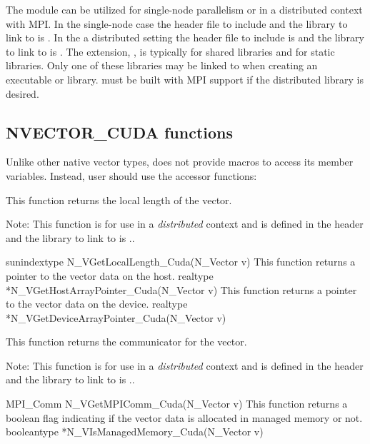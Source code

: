 The {\nveccuda} module can be utilized for single-node parallelism or in a
distributed context with MPI. In the single-node case the header file to
include  and the library to link to is
. In the a distributed setting the header
file to include is  and the library to link to is
. The extension, , is
typically  for shared libraries and  for static libraries.
Only one of these libraries may be linked to when creating an executable
or library. {\sundials} must be built with MPI support if the distributed
library is desired.


\subsection{NVECTOR\_CUDA functions}
\label{ss:nvec_cuda_functions}

Unlike other native {\sundials} vector types, {\nveccuda} does not provide macros
to access its member variables. Instead, user should use the accessor functions:
{
  This function returns the local length of the vector.

  Note: This function is for use in a \textit{distributed} context and
  is defined in the header  and the library
  to link to is ..
}
{
  sunindextype N\_VGetLocalLength\_Cuda(N\_Vector v)
}
{
  This function returns a pointer to the vector data on the host.
}
{
  realtype *N\_VGetHostArrayPointer\_Cuda(N\_Vector v)
}
{
  This function returns a pointer to the vector data on the device.
}
{
  realtype *N\_VGetDeviceArrayPointer\_Cuda(N\_Vector v)
}
{
  This function returns the {\mpi} communicator for the vector.

  Note: This function is for use in a \textit{distributed} context
  and is defined in the header  and the
  library to link to is ..
}
{
  MPI\_Comm N\_VGetMPIComm\_Cuda(N\_Vector v)
}
{
  This function returns a boolean flag indicating if the vector
  data is allocated in managed memory or not.
}
{
  booleantype *N\_VIsManagedMemory\_Cuda(N\_Vector v)
}

